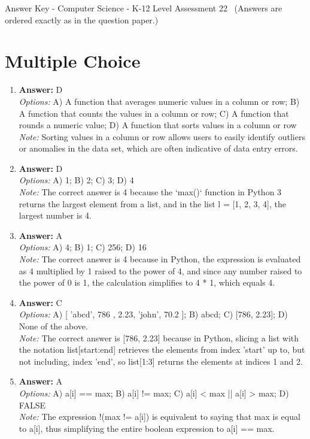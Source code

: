 \documentclass[12pt]{article}
\begin{document}
\begin{center}
Answer Key - Computer Science - K-12 Level Assessment 22 \
\small (Answers are ordered exactly as in the question paper.)
\end{center}

\section*{Multiple Choice}
\begin{enumerate}[label=\arabic*.]
\item \textbf{Answer:} D
\\ \textit{Options:} A) A function that averages numeric values in a column or row; B) A function that counts the values in a column or row; C) A function that rounds a numeric value; D) A function that sorts values in a column or row
\\ \textit{Note:} Sorting values in a column or row allows users to easily identify outliers or anomalies in the data set, which are often indicative of data entry errors.
\item \textbf{Answer:} D
\\ \textit{Options:} A) 1; B) 2; C) 3; D) 4
\\ \textit{Note:} The correct answer is 4 because the `max()` function in Python 3 returns the largest element from a list, and in the list l = [1, 2, 3, 4], the largest number is 4.
\item \textbf{Answer:} A
\\ \textit{Options:} A) 4; B) 1; C) 256; D) 16
\\ \textit{Note:} The correct answer is 4 because in Python, the expression is evaluated as 4 multiplied by 1 raised to the power of 4, and since any number raised to the power of 0 is 1, the calculation simplifies to 4 * 1, which equals 4.
\item \textbf{Answer:} C
\\ \textit{Options:} A) [ 'abcd', 786 , 2.23, 'john', 70.2 ]; B) abcd; C) [786, 2.23]; D) None of the above.
\\ \textit{Note:} The correct answer is [786, 2.23] because in Python, slicing a list with the notation list[start:end] retrieves the elements from index 'start' up to, but not including, index 'end', so list[1:3] returns the elements at indices 1 and 2.
\item \textbf{Answer:} A
\\ \textit{Options:} A) a[i] == max; B) a[i] != max; C) a[i] \textless{} max || a[i] \textgreater{} max; D) FALSE
\\ \textit{Note:} The expression !(max != a[i]) is equivalent to saying that max is equal to a[i], thus simplifying the entire boolean expression to a[i] == max.
\end{enumerate}
\end{document}
